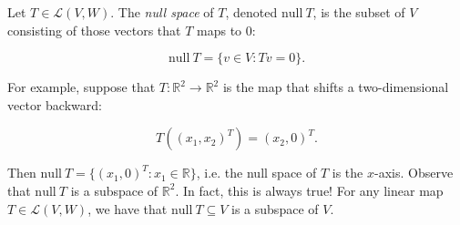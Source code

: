 \documentclass[12pt]{article}
\begin{document}
Let $T \in \mathcal{L} (V, W)$. The \textit{null space} of $T$, denoted $\textrm{null} \: T$, is the subset of $V$ consisting of those vectors that $T$ maps to 0:

$$\textrm{null} \: T = \{ v \in V : Tv = 0 \}.$$

For example, suppose that $T : \mathbb{R}^2 \rightarrow \mathbb{R}^2$ is the map that shifts a two-dimensional vector backward:

$$T( (x_1, x_2)^T ) = (x_2, 0)^T.$$

Then $\textrm{null} \: T = \{ (x_1, 0)^T : x_1 \in \mathbb{R} \}$, i.e. the null space of $T$ is the $x$-axis. Observe that $\textrm{null} \: T$ is a subspace of $\mathbb{R}^2$. In fact, this is always true! For any linear map $T \in \mathcal{L} (V, W)$, we have that $\textrm{null} \: T \subseteq V$ is a subspace of $V$.
\end{document}
